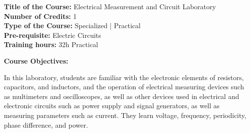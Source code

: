 \documentclass[12pt,a4paper]{article}
\begin{document}
\newpage
\textbf{Title of the Course:} Electrical Measurement and Circuit Laboratory\\
\textbf{Number of Credits:} 1\\
\textbf{Type of the Course:} Specialized | Practical\\
\textbf{Pre-requisite:} Electric Circuits\\
\textbf{Training hours:} 32h Practical\par\vspace{4pt}
\textbf{Course Objectives:}\par\vspace{2pt}
In this laboratory, students are familiar with the electronic elements of resistors, capacitors, and
inductors, and the operation of electrical measuring devices such as multimeters and oscilloscopes,
as well as other devices used in electrical and electronic circuits such as power supply and signal
generators, as well as measuring parameters such as current. They learn voltage, frequency,
periodicity, phase difference, and power.\par\vspace{4pt}
\end{document}
